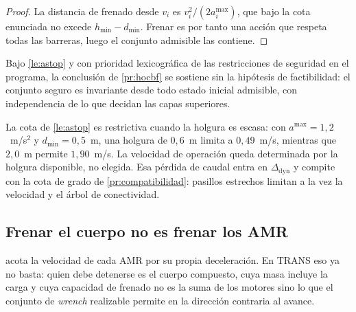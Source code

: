 \begin{proof}
La distancia de frenado desde $v_i$ es $v_i^{2}/(2a^{\max}_i)$, que bajo la cota
enunciada no excede $h_{\min}-d_{\min}$. Frenar es por tanto una acción que
respeta todas las barreras, luego el conjunto admisible las contiene.
\end{proof}

\begin{corolario}
\label{co:invariancia-incondicional}
Bajo \cref{le:astop} y con prioridad lexicográfica de las restricciones de
seguridad en el programa, la conclusión de \cref{pr:hocbf} se sostiene sin la
hipótesis de factibilidad: el conjunto seguro es invariante desde todo estado
inicial admisible, con independencia de lo que decidan las capas superiores.
\end{corolario}

\begin{observacion}
\label{obs:precio-astop}
La cota de \cref{le:astop} es restrictiva cuando la holgura es escasa: con
$a^{\max}=1{,}2$~m/s$^2$ y $d_{\min}=0{,}5$~m, una holgura de $0{,}6$~m limita a
$0{,}49$~m/s, mientras que $2{,}0$~m permite $1{,}90$~m/s. La velocidad de
operación queda determinada por la holgura disponible, no elegida. Esa pérdida
de caudal entra en $\Delta_{\mathrm{dyn}}$ y compite con la cota de grado de
\cref{pr:compatibilidad}: pasillos estrechos limitan a la vez la velocidad y el
árbol de conectividad.
\end{observacion}

\subsection{Frenar el cuerpo no es frenar los AMR}

 acota la velocidad de cada AMR por su propia deceleración. En
\textsf{TRANS} eso ya no basta: quien debe detenerse es el cuerpo compuesto, cuya
masa incluye la carga y cuya capacidad de frenado no es la suma de los motores
sino lo que el conjunto de \emph{wrench} realizable permite en la dirección
contraria al avance.

